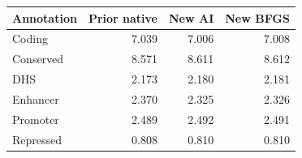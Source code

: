 \begin{tabular}{lrrr}
\toprule
Annotation & Prior native & New AI & New BFGS \\
\midrule
Coding & 7.039 & 7.006 & 7.008 \\
Conserved & 8.571 & 8.611 & 8.612 \\
DHS & 2.173 & 2.180 & 2.181 \\
Enhancer & 2.370 & 2.325 & 2.326 \\
Promoter & 2.489 & 2.492 & 2.491 \\
Repressed & 0.808 & 0.810 & 0.810 \\
\bottomrule
\end{tabular}
